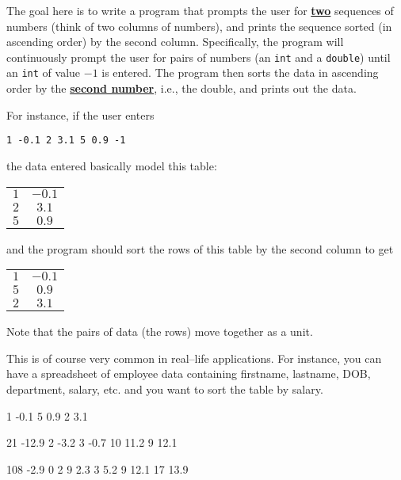 The goal here is to write a program that prompts the user for
\underline{\textbf{two}} sequences of numbers (think of two columns of numbers), and
prints the sequence sorted (in ascending order) by the second column.
Specifically, the program will continuously prompt the user for pairs of
numbers (an \verb!int! and a \verb!double!) until an \verb!int! of value $-1$
is entered. The program then sorts the data in ascending order by the
\underline{\textbf{second number}}, i.e., the double, and prints out the data.

For instance, if the user enters

\begin{center}
\verb!1 -0.1 2 3.1 5 0.9 -1!
\end{center}

the data entered basically model this table:

\begin{longtable}{c c}
$1$ & \hspace{2 cm} $-0.1$ \\ 
$2$ & \hspace{2 cm} $3.1$ \\
$5$ & \hspace{2 cm} $0.9$
\end{longtable}

and the program should sort the rows of this table by the second column to get

\begin{longtable}{c c}
$1$ & \hspace{2 cm} $-0.1$ \\
$5$ & \hspace{2 cm} $0.9$ \\
$2$ & \hspace{2 cm} $3.1$
\end{longtable}
	
Note that the pairs of data (the rows) move together as a unit.

This is of course very common in real--life applications. For instance, you can
have a spreadsheet of employee data containing firstname, lastname, DOB,
department, salary, etc. and you want to sort the table by salary. 

\resett
\nextt
\begin{console}[frame=single, commandchars=\\\{\}]
1 -0.1 
5 0.9
2 3.1
\end{console}

\nextt
\begin{console}[frame=single, commandchars=\\\{\}]
21 -12.9
2 -3.2
3 -0.7
10 11.2
9 12.1
\end{console}

\nextt
\begin{console}[frame=single, commandchars=\\\{\}]
108 -2.9
0 2
9 2.3
3 5.2
9 12.1
17 13.9
\end{console}
